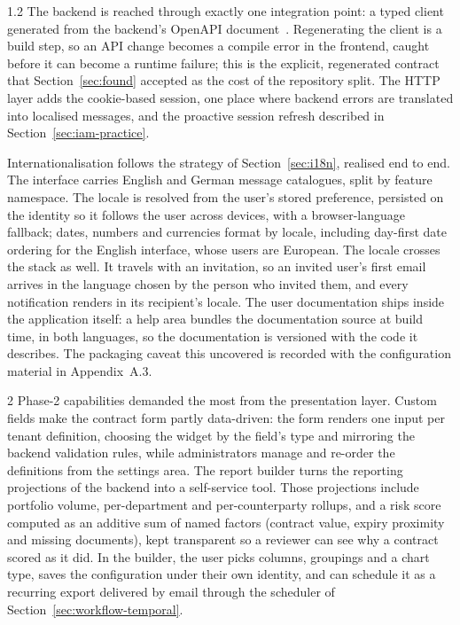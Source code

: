 \begin{spacing}{1.2}
The backend is reached through exactly one integration point: a typed
client generated from the backend's OpenAPI document~\cite{OpenAPI}.
Regenerating the client is a build step, so an API change becomes a
compile error in the frontend, caught before it can become a runtime
failure; this is the explicit, regenerated contract that
Section~\ref{sec:found} accepted as the cost of the repository split.
The HTTP layer adds the cookie-based session, one place where backend
errors are translated into localised messages, and the proactive session
refresh described in Section~\ref{sec:iam-practice}.

Internationalisation follows the strategy of Section~\ref{sec:i18n},
realised end to end. The interface carries English and German message
catalogues, split by feature namespace. The locale is resolved from the
user's stored preference, persisted on the identity so it follows the
user across devices, with a browser-language fallback; dates, numbers
and currencies format by locale, including day-first date ordering for
the English interface, whose users are European. The locale crosses the
stack as well. It travels with an invitation, so an invited user's first
email arrives in the language chosen by the person who invited them, and
every notification renders in its recipient's locale. The user
documentation ships inside the application itself: a help area bundles
the documentation source at build time, in both languages, so the
documentation is versioned with the code it describes. The packaging
caveat this uncovered is recorded with the configuration material in
Appendix~A.3.

2 Phase-2 capabilities demanded the most from the presentation layer.
Custom fields make the contract form partly data-driven: the form renders one
input per tenant definition, choosing the widget by the field's type and
mirroring the backend validation rules, while administrators manage and
re-order the definitions from the settings area. The report builder
turns the reporting projections of the backend into a self-service tool.
Those projections include portfolio volume, per-department and
per-counterparty rollups, and a risk score computed as an additive sum
of named factors (contract value, expiry proximity and missing
documents), kept transparent so a reviewer can see why a contract scored
as it did. In the builder, the user picks columns, groupings and a chart
type, saves the configuration under their own identity, and can schedule
it as a recurring export delivered by email through the scheduler of
Section~\ref{sec:workflow-temporal}.


\end{spacing}

